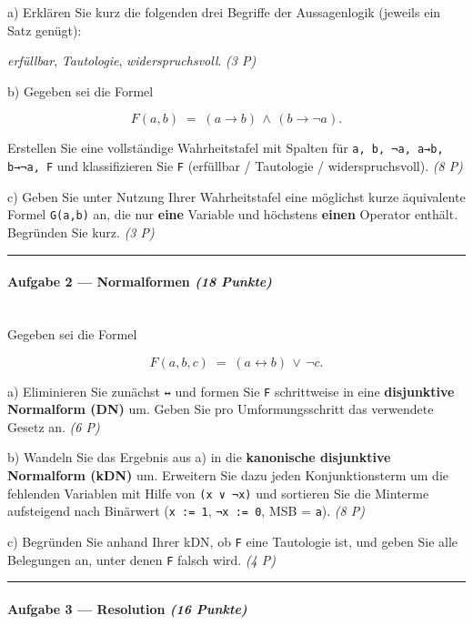 \documentclass[11pt, a4paper]{article}
\begin{document}
a) Erklären Sie kurz die folgenden drei Begriffe der Aussagenlogik (jeweils ein Satz genügt):

\textit{erfüllbar}, \textit{Tautologie}, \textit{widerspruchsvoll}. \textit{(3 P)}


b) Gegeben sei die Formel

\[
F(a,b) \;=\; (a \to b) \,\land\, (b \to \neg a).
\]

Erstellen Sie eine vollständige Wahrheitstafel mit Spalten für \texttt{a, b, ¬a, a→b, b→¬a, F} und klassifizieren Sie \texttt{F} (erfüllbar / Tautologie / widerspruchsvoll). \textit{(8 P)}


c) Geben Sie unter Nutzung Ihrer Wahrheitstafel eine möglichst kurze äquivalente Formel \texttt{G(a,b)} an, die nur \textbf{eine} Variable und höchstens \textbf{einen} Operator enthält. Begründen Sie kurz. \textit{(3 P)}



\noindent\textcolor{rulegray}{\rule{\linewidth}{0.4pt}}


\paragraph{Aufgabe 2 — Normalformen \textit{(18 Punkte)}}\mbox{}\\[2pt]

Gegeben sei die Formel

\[
F(a,b,c) \;=\; (a \leftrightarrow b) \,\lor\, \neg c.
\]


a) Eliminieren Sie zunächst \texttt{↔} und formen Sie \texttt{F} schrittweise in eine \textbf{disjunktive Normalform (DN)} um. Geben Sie pro Umformungsschritt das verwendete Gesetz an. \textit{(6 P)}


b) Wandeln Sie das Ergebnis aus a) in die \textbf{kanonische disjunktive Normalform (kDN)} um. Erweitern Sie dazu jeden Konjunktionsterm um die fehlenden Variablen mit Hilfe von \texttt{(x ∨ ¬x)} und sortieren Sie die Minterme aufsteigend nach Binärwert (\texttt{x := 1}, \texttt{¬x := 0}, MSB = \texttt{a}). \textit{(8 P)}


c) Begründen Sie anhand Ihrer kDN, ob \texttt{F} eine Tautologie ist, und geben Sie alle Belegungen an, unter denen \texttt{F} falsch wird. \textit{(4 P)}



\noindent\textcolor{rulegray}{\rule{\linewidth}{0.4pt}}


\paragraph{Aufgabe 3 — Resolution \textit{(16 Punkte)}}\mbox{}\\[2pt]
\end{document}
